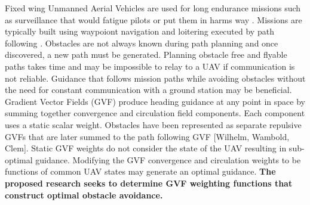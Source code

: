 \documentclass[numbered,pdftex]{ohio-etd}
\begin{document}


 Fixed wing Unmanned Aerial Vehicles are used for long endurance missions such as surveillance that would fatigue pilots or  put them in harms way \cite{bone_uavs_2003}. Missions are typically built using waypoiont navigation and loitering executed by path following \cite{sujit_unmanned_2014}. Obstacles are not always known during path planning and once discovered, a new path must be generated. Planning obstacle free and flyable paths takes time and may be impossible to relay to a UAV if communication is not reliable. Guidance that follows mission paths while avoiding obstacles without the need for constant communication with a ground station  may be beneficial. Gradient Vector Fields (GVF) produce heading guidance at any point in space by summing together convergence and circulation field components. Each component uses a static scalar weight. Obstacles have been represented as separate repulsive GVFs that are later summed to the path following GVF [Wilhelm, Wambold, Clem]. Static GVF weights do not consider the state of the UAV resulting in sub-optimal guidance. Modifying the GVF convergence and circulation weights to be functions of common UAV states may generate an optimal guidance. \textbf{The proposed research seeks to determine GVF weighting functions that construct optimal obstacle avoidance.}
   
\end{document}
